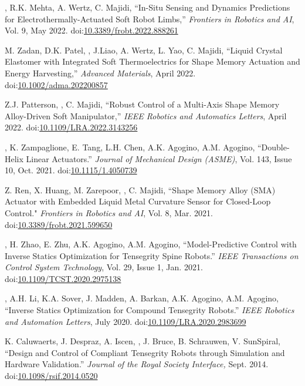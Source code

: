 \documentclass[letterpaper]{deedy-resume} %
\newcommand\doilink[1]{\href{http://dx.doi.org/#1}{#1}}
\newcommand\doi[1]{doi:\doilink{#1}}
\newcommand{\myname}{\underline{{\fontdescript{A.P. Sabelhaus}}}}
\begin{document}
{\begin{etaremune}[itemsep=0.1cm]
\item \myname, R.K. Mehta, A. Wertz, C. Majidi, ``In-Situ Sensing and Dynamics Predictions for Electrothermally-Actuated Soft Robot Limbs,'' {\it Frontiers in Robotics and AI}, Vol. 9, May 2022. \doi{10.3389/frobt.2022.888261}

\item M. Zadan, D.K. Patel, \underline{{}}, J.Liao, A. Wertz, L. Yao, C. Majidi, ``Liquid Crystal Elastomer with Integrated Soft Thermoelectrics for Shape Memory Actuation and Energy Harvesting,'' {\it Advanced Materials}, April 2022. \doi{10.1002/adma.202200857}

\item Z.J. Patterson, \underline{{}}, C. Majidi, ``Robust Control of a Multi-Axis Shape Memory Alloy-Driven Soft Manipulator,'' {\it IEEE Robotics and Automatics Letters}, April 2022. \doi{10.1109/LRA.2022.3143256}

\item \underline{{}}, K. Zampaglione, E. Tang, L.H. Chen, A.K. Agogino, A.M. Agogino, ``Double-Helix Linear Actuators.'' {\it Journal of Mechanical Design (ASME)}, Vol. 143, Issue 10, Oct. 2021. \doi{10.1115/1.4050739}

\item Z. Ren, X. Huang, M. Zarepoor, \underline{{}}, C. Majidi, ``Shape Memory Alloy (SMA) Actuator with Embedded Liquid Metal Curvature Sensor for Closed-Loop Control." {\it Frontiers in Robotics and AI}, Vol. 8, Mar. 2021. \doi{10.3389/frobt.2021.599650}

\item \underline{{}}, H. Zhao, E. Zhu, A.K. Agogino, A.M. Agogino, ``Model-Predictive Control with Inverse Statics Optimization for Tensegrity Spine Robots.'' {\it IEEE Transactions on Control System Technology}, Vol. 29, Issue 1, Jan. 2021. \doi{10.1109/TCST.2020.2975138}

\item \underline{{}}, A.H. Li, K.A. Sover, J. Madden, A. Barkan, A.K. Agogino, A.M. Agogino, ``Inverse Statics Optimization for Compound Tensegrity Robots.'' {\it IEEE Robotics and Automation Letters}, July 2020. \doi{10.1109/LRA.2020.2983699}

\item K. Caluwaerts, J. Despraz, A. Iscen, \underline{{}}, J. Bruce, B. Schrauwen, V. SunSpiral, ``Design and Control of Compliant Tensegrity Robots through Simulation and Hardware Validation.'' {\it Journal of the Royal Society Interface,} Sept. 2014. \doi{10.1098/rsif.2014.0520}


\end{etaremune}}
\end{document}
